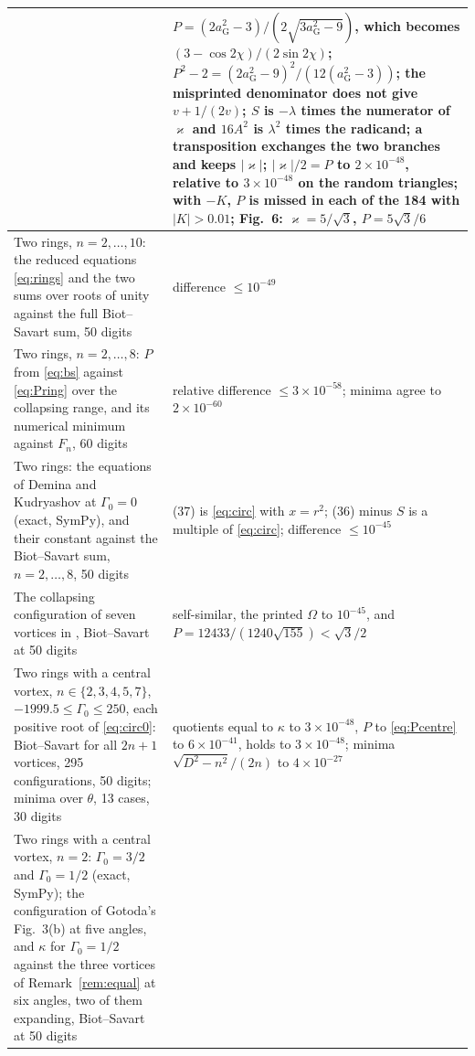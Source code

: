 \documentclass[11pt]{article}
\theoremstyle{definition}
\begin{document}
{\begin{longtable}{|>{\raggedright\arraybackslash}p{}|>{\raggedright\arraybackslash}p{}|}
    & $P = (2a_{\mathrm G}^2 - 3)/(2\sqrt{3a_{\mathrm G}^2 - 9})$, which becomes $(3 - \cos 2\chi)/(2\sin 2\chi)$; $P^2 - 2 = (2a_{\mathrm G}^2 - 9)^2/(12(a_{\mathrm G}^2 - 3))$; the misprinted denominator does not give $v + 1/(2v)$; $S$ is $-\lambda$ times the numerator of $\varkappa$ and $16A^2$ is $\lambda^2$ times the radicand; a transposition exchanges the two branches and keeps $|\varkappa|$; $|\varkappa|/2 = P$ to $2 \times 10^{-48}$, relative to $3 \times 10^{-48}$ on the random triangles; with $-K$, $P$ is missed in each of the 184 with $|K| > 0.01$; Fig.~6: $\varkappa = 5/\sqrt{3}$, $P = 5\sqrt{3}/6$ \\ \hline
  Two rings, $n = 2, \dots, 10$: the reduced equations \eqref{eq:rings} and the two sums over roots of unity against the full Biot--Savart sum, 50 digits
    & difference $\le 10^{-49}$ \\ \hline
  Two rings, $n = 2, \dots, 8$: $P$ from \eqref{eq:bs} against \eqref{eq:Pring} over the collapsing range, and its numerical minimum against $F_n$, 60 digits
    & relative difference $\le 3 \times 10^{-58}$; minima agree to $2 \times 10^{-60}$ \\ \hline
  Two rings: the equations of Demina and Kudryashov \cite[Eqs.~(36)--(37)]{dk2014} at $\Gamma_0 = 0$ (exact, SymPy), and their constant against the Biot--Savart sum, $n = 2, \dots, 8$, 50 digits
    & (37) is \eqref{eq:circ} with $x = r^2$; (36) minus $S$ is a multiple of \eqref{eq:circ}; difference $\le 10^{-45}$ \\ \hline
  The collapsing configuration of seven vortices in \cite[Table~1, Fig.~1a]{dk2014}, Biot--Savart at 50 digits
    & self-similar, the printed $\Omega$ to $10^{-45}$, and $P = 12433/(1240\sqrt{155}) < \sqrt{3}/2$ \\ \hline
  Two rings with a central vortex, $n \in \{2, 3, 4, 5, 7\}$, $-1999.5 \le \Gamma_0 \le 250$, each positive root of \eqref{eq:circ0}: Biot--Savart for all $2n + 1$ vortices, 295 configurations, 50 digits; minima over $\theta$, 13 cases, 30 digits
    & quotients equal to $\kappa$ to $3 \times 10^{-48}$, $P$ to \eqref{eq:Pcentre} to $6 \times 10^{-41}$, \cite[Eq.~(36)]{dk2014} holds to $3 \times 10^{-48}$; minima $\sqrt{D^2 - n^2}/(2n)$ to $4 \times 10^{-27}$ \\ \hline
  Two rings with a central vortex, $n = 2$: $\Gamma_0 = 3/2$ and $\Gamma_0 = 1/2$ (exact, SymPy); the configuration of Gotoda's Fig.~3(b) at five angles, and $\kappa$ for $\Gamma_0 = 1/2$ against the three vortices of Remark~\ref{rem:equal} at six angles, two of them expanding, Biot--Savart at 50 digits

\end{longtable}}
\end{document}
